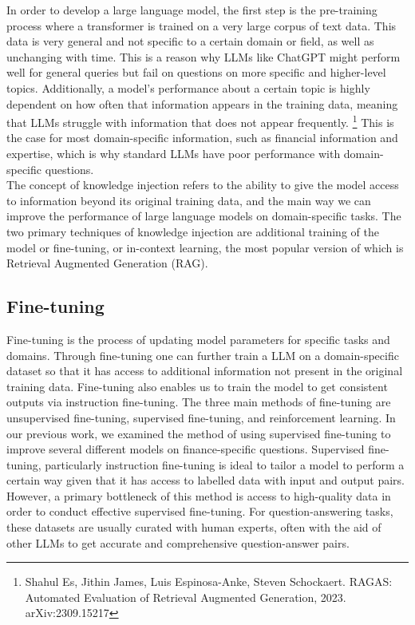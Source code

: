 \documentclass{article}
\begin{document}
    \noindent In order to develop a large language model, the first step is the pre-training process where a transformer is trained on a very large corpus of text data. This data is very general and not specific to a certain domain or field, as well as unchanging with time. This is a reason why LLMs like ChatGPT might perform well for general queries but fail on questions on more specific and higher-level topics. Additionally, a model's performance about a certain topic is highly dependent on how often that information appears in the training data, meaning that LLMs struggle with information that does not appear frequently. \footnote{Shahul Es, Jithin James, Luis Espinosa-Anke, Steven Schockaert. RAGAS: Automated Evaluation of Retrieval Augmented Generation, 2023. arXiv:2309.15217} This is the case for most domain-specific information, such as financial information and expertise, which is why standard LLMs have poor performance with domain-specific questions.
    \\
    
    \noindent The concept of knowledge injection refers to the ability to give the model access to information beyond its original training data, and the main way we can improve the performance of large language models on domain-specific tasks. The two primary techniques of knowledge injection are additional training of the model or fine-tuning, or in-context learning, the most popular version of which is Retrieval Augmented Generation (RAG). 
    
    \subsection{Fine-tuning}

    Fine-tuning is the process of updating model parameters for specific tasks and domains. Through fine-tuning one can further train a LLM on a domain-specific dataset so that it has access to additional information not present in the original training data. Fine-tuning also enables us to train the model to get consistent outputs via instruction fine-tuning. The three main methods of fine-tuning are unsupervised fine-tuning, supervised fine-tuning, and reinforcement learning. In our previous work, we examined the method of using supervised fine-tuning to improve several different models on finance-specific questions. Supervised fine-tuning, particularly instruction fine-tuning is ideal to tailor a model to perform a certain way given that it has access to labelled data with input and output pairs. However, a primary bottleneck of this method is access to high-quality data in order to conduct effective supervised fine-tuning. For question-answering tasks, these datasets are usually curated with human experts, often with the aid of other LLMs to get accurate and comprehensive question-answer pairs. 
    \\
    
\end{document}

